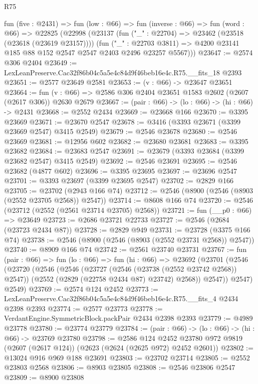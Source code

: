 \begin{lexlean}{R75}
\begin{coremodule}
  fun (five : @2431) =>
  fun (low : @66) =>
  fun (inverse : @66) =>
  fun (word : @66) =>
  @22825
    (@22998
      (@23137
        (fun ("_" : @22704) => @23462 (@23518 (@23618 (@23619 @23157))))
        (fun ("_" : @22703 @3811) =>
        @4200 @23141 @185 @88 @152 @2547 @2547 @2403 @2496 @23257 @5567)))
@23647 := @2574 @306 @2404
@23649 := LexLeanPreserve.Cac32f86b04c5a5e4c84d9f46beb16e4c.R75.__fits_18 @2393
@23651 := @2577 @23649 @2581
@23653 := (v : @66) -> @23647 @23651
@23664 := fun (v : @66) => @2586 @306 @2404 @23651 @1583 @2602 (@2607 (@2617 @306)) @2630 @2679
@23667 := (pair : @66) -> (lo : @66) -> (hi : @66) -> @2431
@23668 := @2552 @2434
@23669 := @23668 @166
@23670 := @3395 @23669
@23671 := @23670 @2547
@23678 := @3416 (@3393 @23671 (@3399 @23669 @2547) @3415 @2549)
@23679 := @2546 @23678
@23680 := @2546 @23669
@23681 := @12956 @602
@23682 := @23680 @23681
@23683 := @3395 @23682
@23684 := @23683 @2547
@23691 := @23679 (@3393 @23684 (@3399 @23682 @2547) @3415 @2549)
@23692 := @2546 @23691
@23695 := @2546 @23682 (@4877 @602)
@23696 := @3395 @23695
@23697 := @23696 @2547
@23701 := @3393 @23697 (@3399 @23695 @2547)
@23702 := @2829 @166
@23705 := @23702 (@2943 @166 @74)
@23712 := @2546 (@8900 (@2546 (@8903 (@2552 @23705 @2568)) @2547))
@23714 := @8608 @166 @74
@23720 := @2546 (@23712 (@2552 (@2561 @23714 @23705) @2568))
@23721 := fun (__p0 : @66) => @23649
@23723 := @2686 @23721 @22733
@23727 := @2546 (@2684 (@23723 @2434 @87))
@23728 := @2829 @949
@23731 := @23728 (@3375 @166 @74)
@23738 := @2546 (@8900 (@2546 (@8903 (@2552 @23731 @2568)) @2547))
@23740 := @8909 @166 @74
@23742 := @2561 @23740 @23731
@23767 := fun (pair : @66) =>
  fun (lo : @66) =>
  fun (hi : @66) =>
  @23692
    (@23701
      (@2546
        (@23720
          (@2546
            (@2546
              (@23727 (@2546 (@23738 (@2552 @23742 @2568)) @2547))
              (@2552 (@2829 (@22758 @2434 @87) @23742) @2568))
            @2547))
        @2547)
      @2549)
@23769 := @2574 @124 @2452
@23773 := LexLeanPreserve.Cac32f86b04c5a5e4c84d9f46beb16e4c.R75.__fits_4 @2434 @2398 @2393
@23774 := @2577 @23773
@23778 := VerdantEngine.SymmetricBlock.packPair @2434 @2398 @2393
@23779 := @4989 @23778
@23780 := @23774 @23779
@23784 := (pair : @66) -> (lo : @66) -> (hi : @66) -> @23769 @23780
@23798 := @2586
    @124
    @2452
    @23780
    @972
    @9819
    (@2607 (@2617 @124))
    (@2623 (@2624 (@2625 @972) @2452 @2601))
@23802 := @13024 @916 @969 @188 @23691
@23803 := @23702 @23714
@23805 := @2552 @23803 @2568
@23806 := @8903 @23805
@23808 := @2546 @23806 @2547
@23809 := @8900 @23808

\end{coremodule}
\end{lexlean}
